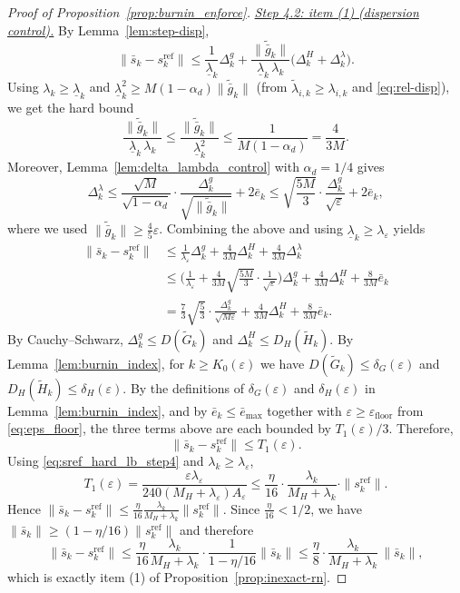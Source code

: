 \documentclass[11pt,a4paper]{article}
\begin{document}
\begin{proof}[Proof of Proposition~\ref{prop:burnin_enforce}]
\smallskip
\noindent\underline{\emph{Step 4.2: item (1) (dispersion control).}}
By Lemma~\ref{lem:step-disp},
\[
\|\bar s_k-s_k^{\mathrm{ref}}\|
\le
\frac{1}{\underline\lambda_k}\Delta_k^g
+\frac{\|\tilde{\bar g}_k\|}{\underline\lambda_k\,\lambda_k}\big(\Delta_k^H+\Delta_k^\lambda\big).
\]
Using $\lambda_k\ge \underline\lambda_k$ and $\underline\lambda_k^2\ge M(1-\alpha_d)\|\tilde{\bar g}_k\|$ (from $\tilde\lambda_{i,k}\ge \lambda_{i,k}$ and \eqref{eq:rel-disp}),
we get the hard bound
\[
\frac{\|\tilde{\bar g}_k\|}{\underline\lambda_k\,\lambda_k}
\le
\frac{\|\tilde{\bar g}_k\|}{\underline\lambda_k^2}
\le \frac{1}{M(1-\alpha_d)}=\frac{4}{3M}.
\]
Moreover, Lemma~\ref{lem:delta_lambda_control} with $\alpha_d=1/4$ gives
\[
\Delta_k^\lambda
\le
\frac{\sqrt{M}}{\sqrt{1-\alpha_d}}\cdot\frac{\Delta_k^g}{\sqrt{\|\tilde{\bar g}_k\|}}
+2\bar e_k
\le
\sqrt{\frac{5M}{3}}\cdot\frac{\Delta_k^g}{\sqrt{\varepsilon}}+2\bar e_k,
\]
where we used $\|\tilde{\bar g}_k\|\ge \frac45\varepsilon$.
Combining the above and using $\underline\lambda_k\ge \lambda_\varepsilon$ yields
\begin{align*}
	\|\bar s_k-s_k^{\mathrm{ref}}\|
	&\le
	\frac{1}{\lambda_\varepsilon}\Delta_k^g
	+\frac{4}{3M}\Delta_k^H
	+\frac{4}{3M}\Delta_k^\lambda\\
	&\le
	\Big(\frac{1}{\lambda_\varepsilon}+\frac{4}{3M}\sqrt{\frac{5M}{3}}\cdot\frac{1}{\sqrt{\varepsilon}}\Big)\Delta_k^g
	+\frac{4}{3M}\Delta_k^H
	+\frac{8}{3M}\bar e_k\\
	&=
	\frac{7}{3}\sqrt{\frac{5}{3}}\cdot\frac{\Delta_k^g}{\sqrt{M\varepsilon}}
	+\frac{4}{3M}\Delta_k^H
	+\frac{8}{3M}\bar e_k.
\end{align*}
By Cauchy--Schwarz, $\Delta_k^g\le D(\tilde G_k)$ and $\Delta_k^H\le D_H(\tilde H_k)$.
By Lemma~\ref{lem:burnin_index}, for $k\ge K_0(\varepsilon)$ we have
$D(\tilde G_k)\le \delta_G(\varepsilon)$ and $D_H(\tilde H_k)\le \delta_H(\varepsilon)$.
By the definitions of $\delta_G(\varepsilon)$ and $\delta_H(\varepsilon)$ in Lemma~\ref{lem:burnin_index}, and by $\bar e_k\le \bar e_{\max}$
together with $\varepsilon\ge \varepsilon_{\mathrm{floor}}$ from \eqref{eq:eps_floor},
the three terms above are each bounded by $T_1(\varepsilon)/3$.
Therefore,
\begin{equation}\label{eq:hard_step_disp_T1}
	\|\bar s_k-s_k^{\mathrm{ref}}\|\le T_1(\varepsilon).
\end{equation}
Using \eqref{eq:sref_hard_lb_step4} and $\lambda_k\ge \lambda_\varepsilon$,
\[
T_1(\varepsilon)
=\frac{\varepsilon\lambda_\varepsilon}{240(M_H+\lambda_\varepsilon)A_\varepsilon}
\le
\frac{\eta}{16}\cdot\frac{\lambda_k}{M_H+\lambda_k}\cdot \|s_k^{\mathrm{ref}}\|.
\]
Hence $\|\bar s_k-s_k^{\mathrm{ref}}\|\le \frac{\eta}{16}\frac{\lambda_k}{M_H+\lambda_k}\|s_k^{\mathrm{ref}}\|$.
Since $\frac{\eta}{16}<1/2$, we have $\|\bar s_k\|\ge (1-\eta/16)\|s_k^{\mathrm{ref}}\|$ and therefore
\[
\|\bar s_k-s_k^{\mathrm{ref}}\|
\le
\frac{\eta}{16}\frac{\lambda_k}{M_H+\lambda_k}\cdot\frac{1}{1-\eta/16}\|\bar s_k\|
\le
\frac{\eta}{8}\cdot\frac{\lambda_k}{M_H+\lambda_k}\,\|\bar s_k\|,
\]
which is exactly item (1) of Proposition~\ref{prop:inexact-rn}.


\end{proof}
\end{document}
